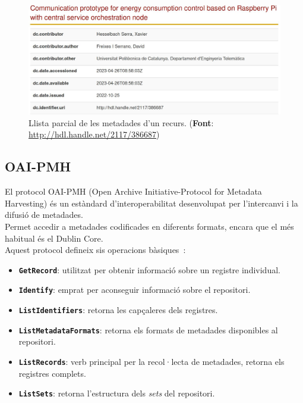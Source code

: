 \begin{figure}[htbp]
    \centerline{\includegraphics[width=\textwidth]{figures/metadata-example}}
    \captionsetup{justification=centering}
    \caption[Llista parcial de les metadades d'un recurs.]{Llista parcial de les metadades d'un recurs. (\textbf{Font}: \url{http://hdl.handle.net/2117/386687})}\label{fig:metadata-example}
\end{figure}

\clearpage

\subsection{\gls{OAI-PMH}}\label{subsec:oai-pmh}

El protocol \gls{OAI-PMH} (Open Archive Initiative-Protocol for Metadata Harvesting) és un estàndard d'interoperabilitat desenvolupat per l'intercanvi i la difusió de metadades. \\

\noindent
Permet accedir a metadades codificades en diferents formats, encara que el més habitual és el \gls{Dublin Core}. \\

\noindent
Aquest protocol defineix sis operacions bàsiques~\cite{oai-pmh}:

\begin{itemize}
    \item \textbf{\texttt{GetRecord}}: utilitzat per obtenir informació sobre un registre individual.
    \item \texttt{\textbf{Identify}}: emprat per aconseguir informació sobre el repositori.
    \item \texttt{\textbf{ListIdentifiers}}: retorna les capçaleres dels registres.
    \item \texttt{\textbf{ListMetadataFormats}}: retorna els formats de metadades disponibles al repositori.
    \item \texttt{\textbf{ListRecords}}: verb principal per la recol·lecta de metadades, retorna els registres complets.
    \item \texttt{\textbf{ListSets}}: retorna l’estructura dels \textit{sets} del repositori.
\end{itemize}

